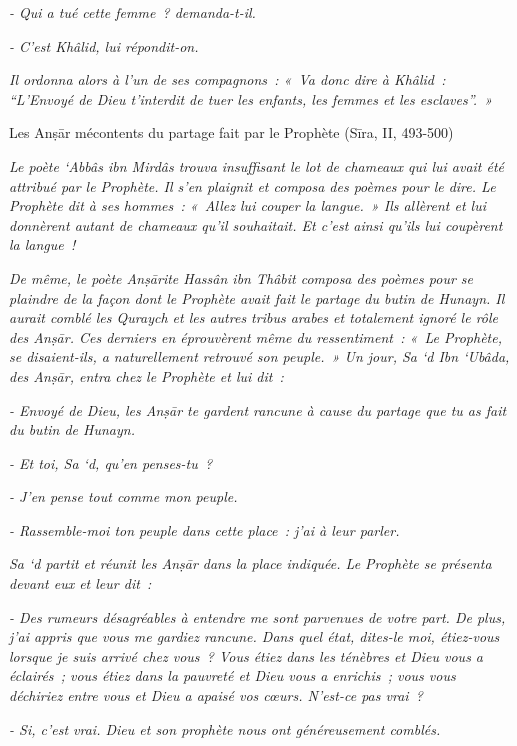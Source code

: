 \emph{- Qui a tué cette femme~? demanda-t-il.}

\emph{- C'est Khâlid, lui répondit-on.}

\emph{Il ordonna alors à l'un de ses compagnons~: «~Va donc dire à
Khâlid~:~ ``L'Envoyé de Dieu t'interdit de tuer les enfants, les femmes
et les esclaves''.~»}

Les Anṣār mécontents du partage fait par le Prophète (Sīra, II, 493-500)

\emph{Le poète `Abbâs ibn Mirdâs trouva insuffisant le lot de chameaux
qui lui avait été attribué par le Prophète. Il s'en plaignit et composa
des poèmes pour le dire. Le Prophète dit à ses hommes~: «~Allez lui
couper la langue.~» Ils allèrent et lui donnèrent autant de chameaux
qu'il souhaitait. Et c'est ainsi qu'ils lui coupèrent la langue~!}

\emph{De même, le poète Anṣārite Hassân ibn Thâbit composa des poèmes
pour se plaindre de la façon dont le Prophète avait fait le partage du
butin de Hunayn. Il aurait comblé les Quraych et les autres tribus
arabes et totalement ignoré le rôle des Anṣār. Ces derniers en
éprouvèrent même du ressentiment~: «~Le Prophète, se disaient-ils, a
naturellement retrouvé son peuple.~» Un jour, Sa `d Ibn `Ubâda, des
Anṣār, entra chez le Prophète et lui dit~:}

\emph{- Envoyé de Dieu, les Anṣār te gardent rancune à cause du partage
que tu as fait du butin de Hunayn.}

\emph{- Et toi, Sa `d, qu'en penses-tu~?}

\emph{- J'en pense tout comme mon peuple.}

\emph{- Rassemble-moi ton peuple dans cette place~: j'ai à leur parler.}

\emph{Sa `d partit et réunit les Anṣār dans la place indiquée. Le
Prophète se présenta devant eux et leur dit~:}

\emph{- Des rumeurs désagréables à entendre me sont parvenues de votre
part. De plus, j'ai appris que vous me gardiez rancune. Dans quel état,
dites-le moi, étiez-vous lorsque je suis arrivé chez vous~? Vous étiez
dans les ténèbres et Dieu vous a éclairés~; vous étiez dans la pauvreté
et Dieu vous a enrichis~; vous vous déchiriez entre vous et Dieu a
apaisé vos cœurs. N'est-ce pas vrai~?}

\emph{- Si, c'est vrai. Dieu et son prophète nous ont généreusement
comblés.}

